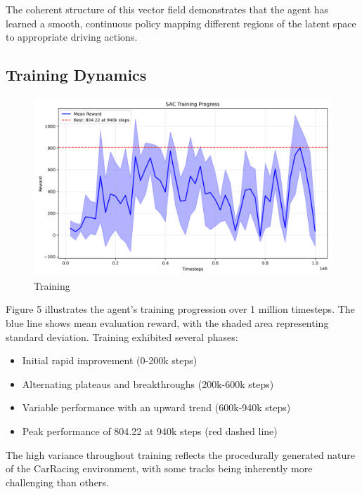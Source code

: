 \documentclass[conference]{IEEEtran}
\begin{document}
The coherent structure of this vector field demonstrates that the agent has learned a smooth, continuous policy mapping different regions of the latent space to appropriate driving actions.

\subsection{Training Dynamics}
\begin{figure}[H]
    \centering
    \includegraphics[width=0.75\linewidth]{Writeup/training-progress.png}
    \caption{Training}
    \label{fig:enter-label}
\end{figure}
Figure 5 illustrates the agent's training progression over 1 million timesteps. The blue line shows mean evaluation reward, with the shaded area representing standard deviation. Training exhibited several phases:
\begin{itemize}
    \item Initial rapid improvement (0-200k steps)
    \item Alternating plateaus and breakthroughs (200k-600k steps)
    \item Variable performance with an upward trend (600k-940k steps)
    \item Peak performance of 804.22 at 940k steps (red dashed line)
\end{itemize}

The high variance throughout training reflects the procedurally generated nature of the CarRacing environment, with some tracks being inherently more challenging than others.
\end{document}
